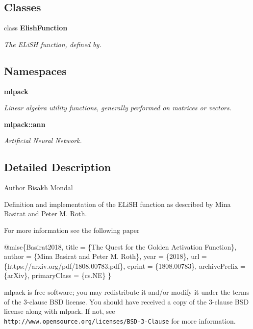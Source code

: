 \subsection*{Classes}
\begin{DoxyCompactItemize}
\item 
class \textbf{ Elish\+Function}
\begin{DoxyCompactList}\small\item\em The E\+Li\+SH function, defined by. \end{DoxyCompactList}\end{DoxyCompactItemize}
\subsection*{Namespaces}
\begin{DoxyCompactItemize}
\item 
 \textbf{ mlpack}
\begin{DoxyCompactList}\small\item\em Linear algebra utility functions, generally performed on matrices or vectors. \end{DoxyCompactList}\item 
 \textbf{ mlpack\+::ann}
\begin{DoxyCompactList}\small\item\em Artificial Neural Network. \end{DoxyCompactList}\end{DoxyCompactItemize}


\subsection{Detailed Description}
\begin{DoxyAuthor}{Author}
Bisakh Mondal
\end{DoxyAuthor}
Definition and implementation of the E\+Li\+SH function as described by Mina Basirat and Peter M. Roth.

For more information see the following paper


\begin{DoxyCode}
@misc\{Basirat2018,
   title = \{The Quest \textcolor{keywordflow}{for} the Golden Activation Function\},
   author = \{Mina Basirat and Peter M. Roth\},
   year = \{2018\},
   url = \{https:\textcolor{comment}{//arxiv.org/pdf/1808.00783.pdf\},}
   eprint = \{1808.00783\},
   archivePrefix = \{arXiv\},
   primaryClass = \{cs.NE\} \}
\end{DoxyCode}


mlpack is free software; you may redistribute it and/or modify it under the terms of the 3-\/clause B\+SD license. You should have received a copy of the 3-\/clause B\+SD license along with mlpack. If not, see {\tt http\+://www.\+opensource.\+org/licenses/\+B\+S\+D-\/3-\/\+Clause} for more information. 
